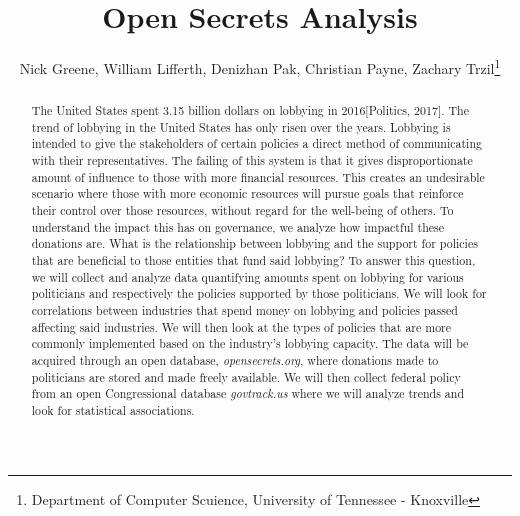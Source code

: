 \documentclass[journal]{IEEEtran}
\begin{document}
\title{Open Secrets Analysis}

\author{Nick Greene, William Lifferth, Denizhan Pak, Christian Payne, Zachary Trzil\thanks{Department of Computer Scuience, University of Tennessee - Knoxville}} \maketitle


\begin{abstract}
  The United States spent 3.15 billion dollars on lobbying in 2016[Politics, 2017]. The trend of lobbying in the United States 
  has only risen over the years. Lobbying is intended to give the stakeholders of certain policies a direct method 
  of communicating with their representatives. The failing of this system is that it gives disproportionate amount 
  of influence to those with more financial resources. This creates an undesirable scenario where those with more 
  economic resources will pursue goals that reinforce their control over those resources, without regard for the 
  well-being of others. To understand the impact this has on governance, we analyze how impactful these donations 
  are. What is the relationship between lobbying and the support for policies that are beneficial to those entities 
  that fund said lobbying? To answer this question, we will collect and analyze data quantifying amounts spent on 
  lobbying for various politicians and respectively the policies supported by those politicians. We will look for 
  correlations between industries that spend money on lobbying and policies passed affecting said industries. We 
  will then look at the types of policies that are more commonly implemented based on the industry's lobbying 
  capacity. The data will be acquired through an open database, \textit{opensecrets.org}, where donations made to 
  politicians are stored and made freely available. We will then collect federal policy from an open Congressional 
  database \textit{govtrack.us} where we will analyze trends and look for statistical associations.
\end{abstract}
\end{document}
